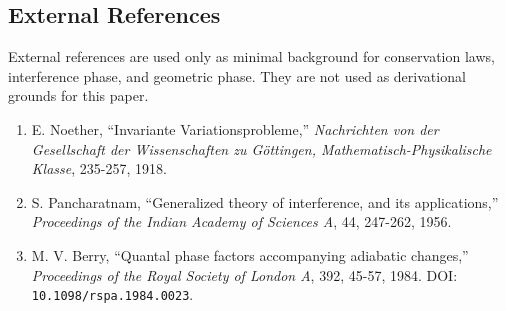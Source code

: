 \documentclass[
  a4paper,
]{article}
\providecommand{\tightlist}{%
  \setlength{\itemsep}{0pt}\setlength{\parskip}{0pt}}
\begin{document}
\subsection{External References}\label{external-references}

External references are used only as minimal background for conservation
laws, interference phase, and geometric phase. They are not used as
derivational grounds for this paper.

\begin{enumerate}
\def\labelenumi{\arabic{enumi}.}
\setcounter{enumi}{5}
\tightlist
\item
  E. Noether, ``Invariante Variationsprobleme,'' \emph{Nachrichten von
  der Gesellschaft der Wissenschaften zu Göttingen,
  Mathematisch-Physikalische Klasse}, 235-257, 1918.
\item
  S. Pancharatnam, ``Generalized theory of interference, and its
  applications,'' \emph{Proceedings of the Indian Academy of Sciences
  A}, 44, 247-262, 1956.
\item
  M. V. Berry, ``Quantal phase factors accompanying adiabatic changes,''
  \emph{Proceedings of the Royal Society of London A}, 392, 45-57, 1984.
  DOI: \texttt{10.1098/rspa.1984.0023}.
\end{enumerate}
\end{document}
